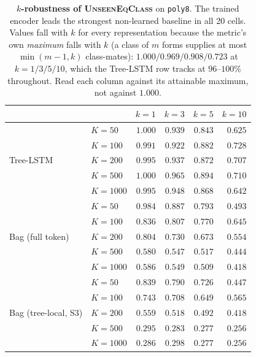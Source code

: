 \begin{table}[h]
\centering
\caption{\textbf{$k$-robustness of \textsc{UnseenEqClass}} on \texttt{poly8}. The trained encoder leads the strongest non-learned baseline in all 20 cells. Values fall with $k$ for every representation because the metric's own \emph{maximum} falls with $k$ (a class of $m$ forms supplies at most $\min(m{-}1,k)$ class-mates): $1.000/0.969/0.908/0.723$ at $k{=}1/3/5/10$, which the Tree-LSTM row tracks at $96$--$100\%$ throughout. Read each column against its attainable maximum, not against $1.000$.}
\label{tab:k_sweep}
\small
\begin{tabular}{l l rrrr}
\toprule
 & & $k{=}1$ & $k{=}3$ & $k{=}5$ & $k{=}10$ \\
\midrule
\multirow{5}{*}{Tree-LSTM} & $K{=}50$ & $1.000$ & $0.939$ & $0.843$ & $0.625$ \\
 & $K{=}100$ & $0.991$ & $0.922$ & $0.882$ & $0.728$ \\
 & $K{=}200$ & $0.995$ & $0.937$ & $0.872$ & $0.707$ \\
 & $K{=}500$ & $1.000$ & $0.965$ & $0.894$ & $0.710$ \\
 & $K{=}1000$ & $0.995$ & $0.948$ & $0.868$ & $0.642$ \\
\midrule
\multirow{5}{*}{Bag (full token)} & $K{=}50$ & $0.984$ & $0.887$ & $0.793$ & $0.493$ \\
 & $K{=}100$ & $0.836$ & $0.807$ & $0.770$ & $0.645$ \\
 & $K{=}200$ & $0.804$ & $0.730$ & $0.673$ & $0.554$ \\
 & $K{=}500$ & $0.580$ & $0.547$ & $0.517$ & $0.444$ \\
 & $K{=}1000$ & $0.586$ & $0.549$ & $0.509$ & $0.418$ \\
\midrule
\multirow{5}{*}{Bag (tree-local, S3)} & $K{=}50$ & $0.839$ & $0.790$ & $0.726$ & $0.447$ \\
 & $K{=}100$ & $0.743$ & $0.708$ & $0.649$ & $0.565$ \\
 & $K{=}200$ & $0.559$ & $0.518$ & $0.492$ & $0.418$ \\
 & $K{=}500$ & $0.295$ & $0.283$ & $0.277$ & $0.256$ \\
 & $K{=}1000$ & $0.286$ & $0.298$ & $0.277$ & $0.256$ \\
\bottomrule
\end{tabular}
\end{table}

